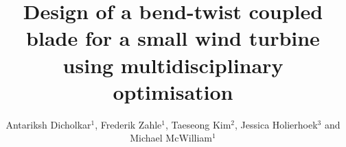 \documentclass[a4paper]{jpconf}
\begin{document}
\title{Design of a bend-twist coupled blade for a small wind turbine using multidisciplinary optimisation}

\author{Antariksh Dicholkar$^1$, Frederik Zahle$^1$, Taeseong Kim$^2$, Jessica Holierhoek$^3$ and Michael McWilliam$^1$}

\address{$^1$ DTU Wind Energy, DTU Ris{\o} campus, Frederiksborgvej 399, DK-4000 Roskilde}
\address{$^2$ DTU Wind Energy, Technical University of Denmark, Nils Koppels All{\'e}, Building 403, DK-2800 Kgs. Lyngby }
\address{$^3$ Faculty of Aerospace Engineering, TU Delft, Kluyverweg 1, 2629 HS Delft,
The Netherlands}

\end{document}
